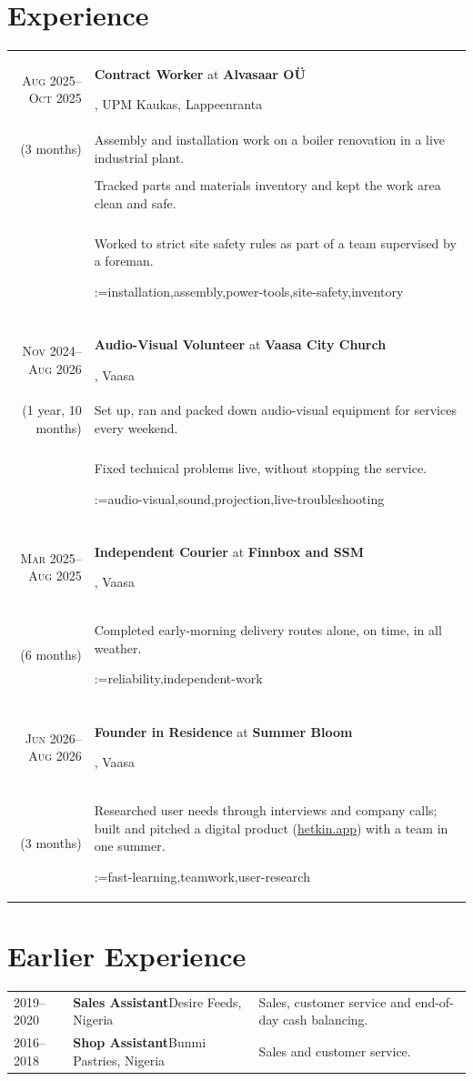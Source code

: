 \documentclass[a4paper,11pt]{article}
\makeatletter
\newcommand{\sotag}[1]{\tikz[baseline]{\node[anchor=base, rounded corners=0.5ex, text height=1.5ex, text depth=.25ex, fill=tagbg, draw=tagbg, text=tagtxt] {#1};}}
\newcommand{\sotagrow}[1]{\par\vspace{4pt}\noindent\@for\sotagitem:=#1\do{\sotag{\sotagitem} }\\}
\newcommand{\job}[2]{\large\sffamily \textbf{#1} at \textbf{#2}\rule[-0.45em]{0pt}{1.45em}}
\newcommand{\sep}{\multicolumn{2}{c}{}\\}
\makeatother
\begin{document}
\section{Experience}
\begin{longtable}{r|p{}}

  \textsc{Aug 2025--Oct 2025} & \job{Contract Worker}{Alvasaar OÜ}, UPM Kaukas, Lappeenranta \\(3 months)
    &Assembly and installation work on a boiler renovation in a live industrial plant.\\&\\
    &Tracked parts and materials inventory and kept the work area clean and safe.\\&\\
    &Worked to strict site safety rules as part of a team supervised by a foreman.\sotagrow{installation,assembly,power-tools,site-safety,inventory}\sep

  \textsc{Nov 2024--Aug 2026} & \job{Audio-Visual Volunteer}{Vaasa City Church}, Vaasa \\(1 year, 10 months)
    &Set up, ran and packed down audio-visual equipment for services every weekend.\\&\\
    &Fixed technical problems live, without stopping the service.\sotagrow{audio-visual,sound,projection,live-troubleshooting}\sep

  \textsc{Mar 2025--Aug 2025} & \job{Independent Courier}{Finnbox and SSM}, Vaasa \\(6 months)
    &Completed early-morning delivery routes alone, on time, in all weather.\sotagrow{reliability,independent-work}\sep

  \textsc{Jun 2026--Aug 2026} & \job{Founder in Residence}{Summer Bloom}, Vaasa \\(3 months)
    &Researched user needs through interviews and company calls; built and pitched a digital product (\href{https://hetkin.app}{hetkin.app}) with a team in one summer.\sotagrow{fast-learning,teamwork,user-research}
\end{longtable}

\section{Earlier Experience}
\begin{longtable}{@{}p{}|p{}|p{}@{}}
  \textsc{2019--2020} & \textbf{Sales Assistant}\newline Desire Feeds, Nigeria
    &Sales, customer service and end-of-day cash balancing.
    \par\vspace{8pt} \\
  \textsc{2016--2018} & \textbf{Shop Assistant}\newline Bunmi Pastries, Nigeria
    &Sales and customer service.
    \par\vspace{5pt}
\end{longtable}
\end{document}
